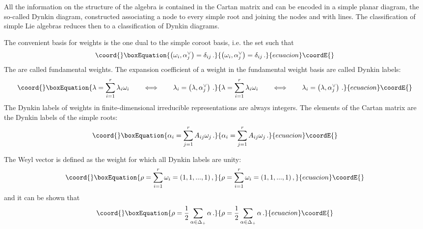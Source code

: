 \documentclass[a4paper,12pt]{report}
\begin{document}
All the information on the structure of the algebra \coordHE{} is contained in the Cartan matrix and can be encoded in a
simple planar diagram, the so-called Dynkin diagram, constructed associating a node to every simple root
\coordHE{} and joining the nodes \coordHE{} and \coordHE{} with \coordHE{} lines. The classification of simple Lie
algebras reduces then to a classification of Dynkin diagrams.

The convenient basis for weights is the one dual to the simple coroot basis, i.e. the set
\coordHE{} such that
\begin{equation}\coord{}\boxEquation{
\left(\omega_{i},\alpha_{j}^{\vee}\right)=\delta_{ij}\,.
}{
\left(\omega_{i},\alpha_{j}^{\vee}\right)=\delta_{ij}\,.
}{ecuacion}\coordE{}\end{equation}
The \coordHE{} are called fundamental weights. The expansion coefficient \coordHE{} of a weight \myHighlight{$\lambda$}\coordHE{} in
the fundamental weight basis are called Dynkin labels:
\begin{equation}\coord{}\boxEquation{
\lambda=\sum_{i=1}^{r}\lambda_{i}\omega_{i}\qquad\Longleftrightarrow\qquad\lambda_{i}=\left(\lambda,\alpha_{j}^{\vee}\right)\,.
}{
\lambda=\sum_{i=1}^{r}\lambda_{i}\omega_{i}\qquad\Longleftrightarrow\qquad\lambda_{i}=\left(\lambda,\alpha_{j}^{\vee}\right)\,.
}{ecuacion}\coordE{}\end{equation}
The Dynkin labels of weights in finite-dimensional irreducible representations are always integers. The elements
of the Cartan matrix are the Dynkin labels of the simple roots:
\begin{equation}\coord{}\boxEquation{
\alpha_{i}=\sum_{j=1}^{r}A_{ij}\omega_{j}\,.
}{
\alpha_{i}=\sum_{j=1}^{r}A_{ij}\omega_{j}\,.
}{ecuacion}\coordE{}\end{equation}


The Weyl vector is defined as the weight for which all Dynkin labels are unity:
\begin{equation}\coord{}\boxEquation{
\rho=\sum_{i=1}^{r}\omega_{i}=(1,1,...,1)\,,
}{
\rho=\sum_{i=1}^{r}\omega_{i}=(1,1,...,1)\,,
}{ecuacion}\coordE{}\end{equation}
and it can be shown that
\begin{equation}\coord{}\boxEquation{
\rho=\frac{1}{2}\sum_{\alpha\in\Delta_{+}}\alpha\,.
}{
\rho=\frac{1}{2}\sum_{\alpha\in\Delta_{+}}\alpha\,.
}{ecuacion}\coordE{}\end{equation}
\end{document}
